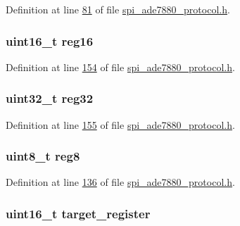 Definition at line \hyperlink{a00041_source_l00081}{81} of file \hyperlink{a00041_source}{spi\-\_\-ade7880\-\_\-protocol.\-h}.

\hypertarget{a00041_a0c22d234d52e616d449a8c264bf2030b}{
\subsubsection[{reg16}]{\setlength{\rightskip}{0pt plus 5cm}uint16\-\_\-t reg16}}\label{dd/d32/a00041_a0c22d234d52e616d449a8c264bf2030b}


Definition at line \hyperlink{a00041_source_l00154}{154} of file \hyperlink{a00041_source}{spi\-\_\-ade7880\-\_\-protocol.\-h}.

\hypertarget{a00041_a83e2be8d3feb1bcbc286bfaae10ac552}{
\subsubsection[{reg32}]{\setlength{\rightskip}{0pt plus 5cm}uint32\-\_\-t reg32}}\label{dd/d32/a00041_a83e2be8d3feb1bcbc286bfaae10ac552}


Definition at line \hyperlink{a00041_source_l00155}{155} of file \hyperlink{a00041_source}{spi\-\_\-ade7880\-\_\-protocol.\-h}.

\hypertarget{a00041_a90b3f782e917edca7101e7803a3773b7}{
\subsubsection[{reg8}]{\setlength{\rightskip}{0pt plus 5cm}uint8\-\_\-t reg8}}\label{dd/d32/a00041_a90b3f782e917edca7101e7803a3773b7}


Definition at line \hyperlink{a00041_source_l00136}{136} of file \hyperlink{a00041_source}{spi\-\_\-ade7880\-\_\-protocol.\-h}.

\hypertarget{a00041_ac02048009fa6718e40f028b6bae63f3d}{
\subsubsection[{target\-\_\-register}]{\setlength{\rightskip}{0pt plus 5cm}uint16\-\_\-t target\-\_\-register}}\label{dd/d32/a00041_ac02048009fa6718e40f028b6bae63f3d}


